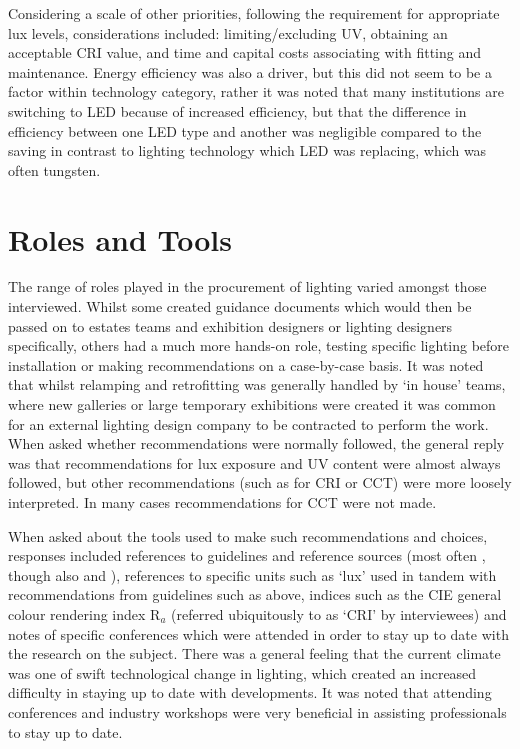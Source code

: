 Considering a scale of other priorities, following the requirement for appropriate lux levels, considerations included: limiting/excluding \gls{UV}, obtaining an acceptable \gls{CRI} value, and time and capital costs associating with fitting and maintenance. Energy efficiency was also a driver, but this did not seem to be a factor within technology category, rather it was noted that many institutions are switching to \gls{LED} because of increased efficiency, but that the difference in efficiency between one \gls{LED} type and another was negligible compared to the saving in contrast to lighting technology which \gls{LED} was replacing, which was often tungsten.

\section{Roles and Tools}
The range of roles played in the procurement of lighting varied amongst those interviewed. Whilst some created guidance documents which would then be passed on to estates teams and exhibition designers or lighting designers specifically, others had a much more hands-on role, testing specific lighting before installation or making recommendations on a case-by-case basis. It was noted that whilst relamping and retrofitting was generally handled by `in house' teams, where new galleries or large temporary exhibitions were created it was common for an external lighting design company to be contracted to perform the work. When asked whether recommendations were normally followed, the general reply was that recommendations for lux exposure and UV content were almost always followed, but other recommendations (such as for \gls{CRI} or \gls{CCT}) were more loosely interpreted. In many cases recommendations for \gls{CCT} were not made.

When asked about the tools used to make such recommendations and choices, responses included references to guidelines and reference sources (most often \citet{thomson_museum_1986}, though also \citet{druzik_guidelines_2012} and \citet{british_standards_institution_pas_2012}), references to specific units such as `lux' used in tandem with recommendations from guidelines such as above, indices such as the \gls{CIE} general colour rendering index R$_a$ (referred ubiquitously to as `\gls{CRI}' by interviewees) and notes of specific conferences which were attended in order to stay up to date with the research on the subject. There was a general feeling that the current climate was one of swift technological change in lighting, which created an increased difficulty in staying up to date with developments. It was noted that attending conferences and industry workshops were very beneficial in assisting professionals to stay up to date. 


